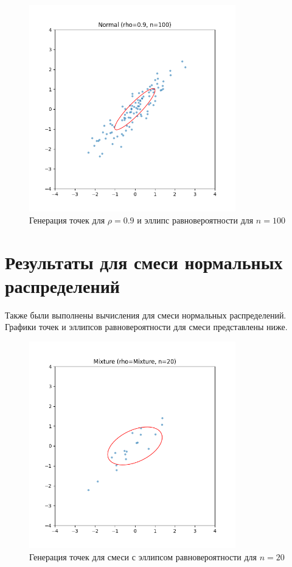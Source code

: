 \documentclass[a4paper]{article}
\begin{document}
    \begin{figure}[H]
        \centering
        \includegraphics[width=0.8\textwidth]{./plots/normal_rho0.9_n100}
        \caption{Генерация точек для $\rho = 0.9$ и эллипс равновероятности для $n=100$}
        \label{fig:normal_rho0.9_n100}
    \end{figure}


    \section{Результаты для смеси нормальных распределений}\label{sec:mixture_results}
    Также были выполнены вычисления для смеси нормальных распределений. Графики точек и эллипсов равновероятности для смеси представлены ниже.

    \begin{figure}[H]
        \centering
        \includegraphics[width=0.8\textwidth]{./plots/mixture_rhoMixture_n20}
        \caption{Генерация точек для смеси с эллипсом равновероятности для $n=20$}
        \label{fig:mixture_rhoMixture_n20}
    \end{figure}
\end{document}
